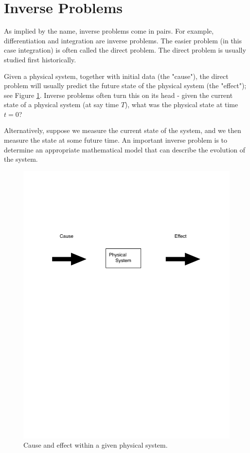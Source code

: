 \section*{Inverse Problems}
As implied by the name, inverse problems come in pairs. For example, differentiation and integration are inverse problems. The easier problem (in this case integration) is often called the direct problem. The direct problem is usually studied first historically.

Given a physical system, together with initial data (the "cause"), the direct problem will usually predict the future state of the physical system (the "effect"); see Figure \ref{fig:cause_and_effect}.  Inverse problems often turn this on its head - given the current state of a physical system (at say time $T$), what was the physical state at time $t = 0$?  

Alternatively, suppose we measure the current state of the system, and we then measure the state at some future time. An important inverse problem is to determine an appropriate mathematical model that can describe the evolution of the system.



\begin{figure}
\centering
\includegraphics[width=\textwidth]{cause_and_effect.pdf}
\caption{Cause and effect within a given physical system.}
\label{fig:cause_and_effect}
\end{figure}

